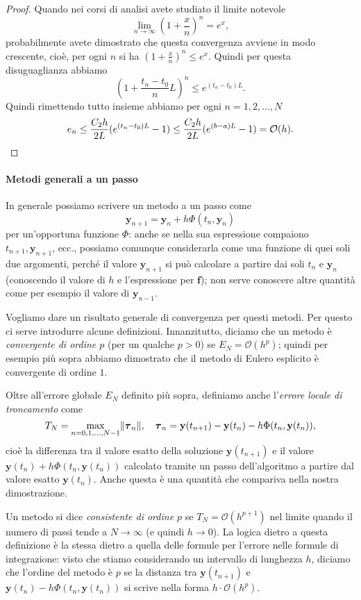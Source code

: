 \documentclass[a4paper]{report}
\DeclarePairedDelimiter{\norm}{\lVert}{\rVert}
\theoremstyle{definiton}
\theoremstyle{remark}
\newcommand{\y}{\mathbf{y}}
\newcommand{\f}{\mathbf{f}}
\begin{document}
\begin{proof}
Quando nei corsi di analisi avete studiato il limite notevole
\[
    \lim_{n\to\infty} \left(1+\frac{x}{n}\right)^n = e^x,
\]
probabilmente avete dimostrato che questa convergenza avviene in modo crescente, cioè, per ogni $n$ si ha $\left(1+\frac{x}{n}\right)^n \leq e^x$. Quindi per questa disuguaglianza abbiamo
\[
\left(1+\frac{t_n-t_0}{n}L\right)^n \leq e^{(t_n-t_0)L}.
\]
Quindi rimettendo tutto insieme abbiamo per ogni $n=1,2,\dots,N$
\[
e_n \leq \frac{C_2 h}{2L}(e^{(t_n-t_0)L}-1) \leq \frac{C_2 h}{2L}(e^{(b-a)L}-1) = \mathcal{O}(h). \qedhere
\]

\end{proof}

\paragraph{Metodi generali a un passo}

In generale possiamo scrivere un metodo a un passo come
\begin{equation} \label{metodoaunpasso}
    \y_{n+1} = \y_n + h\Phi(t_n,\y_n)    
\end{equation}
per un'opportuna funzione $\Phi$: anche se nella sua espressione compaiono $t_{n+1},\y_{n+1}$, ecc., possiamo comunque considerarla come una funzione di quei soli due argomenti, perché il valore $\y_{n+1}$ si può calcolare a partire dai soli $t_n$ e $\y_n$ (conoscendo il valore di $h$ e l'espressione per $\f$); non serve conoscere altre quantità come per esempio il valore di $\y_{n-1}$.

Vogliamo dare un risultato generale di convergenza per questi metodi. Per questo ci serve introdurre alcune definizioni. Innanzitutto, diciamo che un metodo è \emph{convergente di ordine $p$} (per un qualche $p>0$) se $E_N = \mathcal{O}(h^p)$; quindi per esempio più sopra abbiamo dimostrato che il metodo di Eulero esplicito è convergente di ordine $1$.

Oltre all'errore globale $E_N$ definito più sopra, definiamo anche l'\emph{errore locale di troncamento} come
\[
T_N = \max_{n=0,1,\dots,N-1} \norm{\boldsymbol{\tau}_n}, \quad \boldsymbol{\tau}_n = \y(t_{n+1}) - \y(t_n) - h\Phi(t_n, \y(t_n)) ,
\]
cioè la differenza tra il valore esatto della soluzione $\y(t_{n+1})$ e il valore $\y(t_n) + h\Phi(t_n, \y(t_n))$ calcolato tramite un passo dell'algoritmo a partire dal valore esatto $\y(t_n)$. Anche questa è una quantità che compariva nella nostra dimostrazione.

Un metodo si dice \emph{consistente di ordine $p$} se $T_N = \mathcal{O}(h^{p+1})$ nel limite quando il numero di passi tende a $N\to \infty$ (e quindi $h \to 0$). La logica dietro a questa definizione è la stessa dietro a quella delle formule per l'errore nelle formule di integrazione: visto che stiamo considerando un intervallo di lunghezza $h$, diciamo che l'ordine del metodo è $p$ se la distanza tra $\y(t_{n+1})$ e $\y(t_n) - h\Phi(t_n, \y(t_n))$ si scrive nella forma $h \cdot \mathcal{O}(h^p)$.
\end{document}
